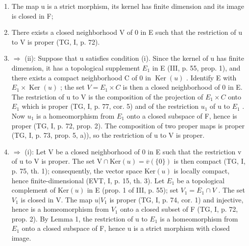 \begin{enumerate}
\def\labelenumi{(\roman{enumi})}
\item
  The map u is a strict morphism, its kernel has finite dimension and its image is closed in F;
\item
  There exists a closed neighborhood V of 0 in E such that the restriction of u to V is proper (TG, I, p. 72).
\item
  \(\Longrightarrow\) (ii): Suppose that u satisfies condition (i). Since the kernel of u has finite dimension, it has a topological supplement \(E_{1}\) in E (III, p. 55, prop. 1), and there exists a compact neighborhood C of 0 in \(\operatorname{Ker}(u)\) . Identify E with \(E_{1} \times \operatorname{Ker}(u)\) ; the set \(V = E_{1} \times C\) is then a closed neighborhood of 0 in E. The restriction of u to V is the composition of the projection of \(E_{1} \times C\) onto \(E_{1}\) which is proper (TG, I, p. 77, cor. 5) and of the restriction \(u_{1}\) of u to \(E_{1}\) . Now \(u_{1}\) is a homeomorphism from \(E_{1}\) onto a closed subspace of F, hence is proper (TG, I, p. 72, prop. 2). The composition of two proper maps is proper (TG, I, p. 73, prop. 5, a)), so the restriction of u to V is proper.
\item
  \(\Longrightarrow\) (i): Let V be a closed neighborhood of 0 in E such that the restriction v of u to V is proper. The set \(\mathrm{V} \cap \mathrm{Ker}(u) = \overline{v}(\{0\})\) is then compact (TG, I, p. 75, th. 1); consequently, the vector space \(\mathrm{Ker}(u)\) is locally compact, hence finite-dimensional (EVT, I, p. 15, th. 3). Let \(E_{1}\) be a topological complement of \(\mathrm{Ker}(u)\) in E (prop. 1 of III, p. 55); set \(V_{1} = E_{1} \cap V\) . The set \(V_{1}\) is closed in V. The map \(u|V_{1}\) is proper (TG, I, p. 74, cor. 1) and injective, hence is a homeomorphism from \(V_{1}\) onto a closed subset of F (TG, I, p. 72, prop. 2). By Lemma 1, the restriction of u to \(E_{1}\) is a homeomorphism from \(E_{1}\) onto a closed subspace of F, hence u is a strict morphism with closed image.
\end{enumerate}

